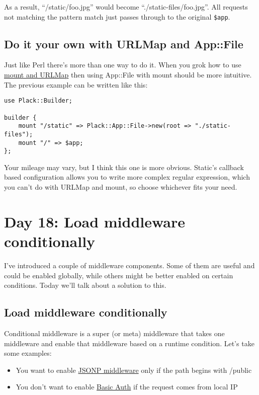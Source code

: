 As a result, ``/static/foo.jpg'' would become
``./static-files/foo.jpg''. All requests not matching the pattern match
just passes through to the original \lstinline!$app!.

\subsection{Do it your own with URLMap and
App::File}\label{do-it-your-own-with-urlmap-and-appfile}

Just like Perl there's more than one way to do it. When you grok how to
use
\href{http://advent.plackperl.org/2009/12/day-12-maps-multiple-apps-with-mount-and-urlmap.html}{mount
and URLMap} then using App::File with mount should be more intuitive.
The previous example can be written like this:

\begin{lstlisting}
use Plack::Builder;

builder {
    mount "/static" => Plack::App::File->new(root => "./static-files");
    mount "/" => $app;
};
\end{lstlisting}

Your mileage may vary, but I think this one is more obvious. Static's
callback based configuration allows you to write more complex regular
expression, which you can't do with URLMap and mount, so choose
whichever fits your need.

\section{Day 18: Load middleware
conditionally}\label{day-18-load-middleware-conditionally}

I've introduced a couple of middleware components. Some of them are
useful and could be enabled globally, while others might be better
enabled on certain conditions. Today we'll talk about a solution to
this.

\subsection{Load middleware
conditionally}\label{load-middleware-conditionally}

Conditional middleware is a super (or meta) middleware that takes one
middleware and enable that middleware based on a runtime condition.
Let's take some examples:

\begin{itemize}
\itemsep1pt\parskip0pt
\item
  You want to enable
  \href{http://advent.plackperl.org/2009/12/day-16-adding-jsonp-support-to-your-app.html}{JSONP
  middleware} only if the path begins with /public
\item
  You don't want to enable
  \href{http://advent.plackperl.org/2009/12/day-15-authenticate-your-app-with-middleware.html}{Basic
  Auth} if the request comes from local IP
\end{itemize}

